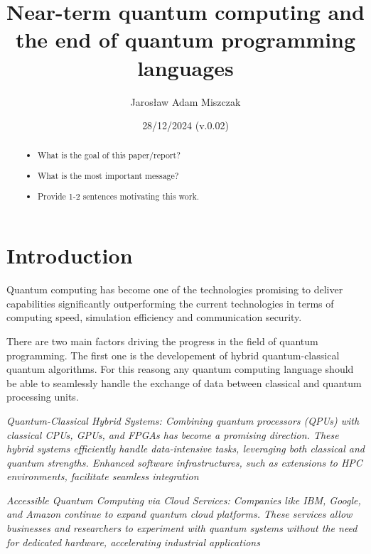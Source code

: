 \documentclass[10pt,a4paper]{article}
\title{Near-term quantum computing and the end of quantum programming languages}
\author{Jarosław Adam Miszczak}
\date{28/12/2024 (v.0.02)}
\begin{document}
\maketitle


\begin{abstract}
	\begin{itemize}
		\item What is the goal of this paper/report?
		\item What is the most important message?
		\item Provide 1-2 sentences motivating this work.
	\end{itemize}
\end{abstract}


	
\section{Introduction}

Quantum computing has become one of the technologies promising to deliver capabilities significantly outperforming the current technologies in terms of computing speed, simulation efficiency and communication security.

There are two main factors driving the progress in the field of quantum programming. The first one is the developement of hybrid quantum-classical quantum algorithms. For this reasong any quantum computing language should be able to seamlessly handle the exchange of data between classical and quantum processing units.

\emph{Quantum-Classical Hybrid Systems: Combining quantum processors (QPUs) with classical CPUs, GPUs, and FPGAs has become a promising direction. These hybrid systems efficiently handle data-intensive tasks, leveraging both classical and quantum strengths. Enhanced software infrastructures, such as extensions to HPC environments, facilitate seamless integration}


\emph{Accessible Quantum Computing via Cloud Services: Companies like IBM, Google, and Amazon continue to expand quantum cloud platforms. These services allow businesses and researchers to experiment with quantum systems without the need for dedicated hardware, accelerating industrial applications}
\end{document}
